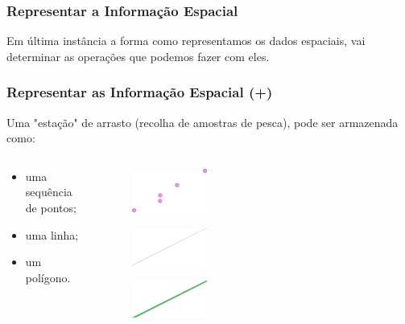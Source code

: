 \documentclass[hyperref={pdfpagelabels=true}]{beamer}
\begin{document}
\begin{frame}
\frametitle{Representar a Informa\c{c}\~{a}o Espacial}

Em \'{u}ltima inst\^{a}ncia a forma como representamos os dados espaciais, vai determinar as opera\c{c}\~{o}es que podemos fazer com eles.

\end{frame}

\begin{frame}
\frametitle{Representar as Informa\c{c}\~{a}o Espacial (+)}

Uma "esta\c{c}\~{a}o" de arrasto (recolha de amostras de pesca), pode ser armazenada como:

\begin{columns}
  \begin{column}{0.5\textwidth}

    \begin{itemize}
      \item<2-> uma sequ\^{e}ncia de pontos;
      \item<3-> uma linha;%
      \item<4-> um pol\'{i}gono.%
      \end{itemize}


  \end{column}
  \begin{column}{0.5\textwidth}
    \begin{figure}
      \includegraphics[width=0.3\textwidth]{trawl_pts.png}
    \end{figure}
    \begin{figure}
      \includegraphics[width=0.3\textwidth]{trawl_lines.png}
    \end{figure}
    \begin{figure}
      \includegraphics[width=0.3\textwidth]{trawl_poly.png}
    \end{figure}
  \end{column}  
\end{columns}
\end{frame}
\end{document}
